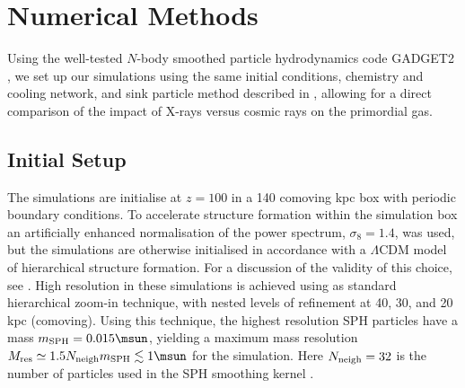 \section{Numerical Methods}
\label{methods}
Using the well-tested $N$-body smoothed particle hydrodynamics code GADGET2 \citep{Springel2005}, we set up our simulations using the same initial conditions, chemistry and cooling network, and sink particle method described in \citet{Hummeletal2014}, allowing for a direct comparison of the impact of X-rays versus cosmic rays on the primordial gas. 

\subsection{Initial Setup}
\label{setup}
The simulations are initialise at $z=100$ in a 140 comoving kpc box with periodic boundary conditions. To accelerate structure formation within the simulation box an artificially enhanced normalisation of the power spectrum, $\sigma_8 = 1.4$, was used, but the simulations are otherwise initialised in accordance with a $\Lambda$CDM model of hierarchical structure formation. For a discussion of the validity of this choice, see \citet{StacyGreifBromm2010}. High resolution in these simulations is achieved using as standard hierarchical zoom-in technique, with nested levels of refinement at 40, 30, and 20 kpc (comoving).  Using this technique, the highest resolution SPH particles have a mass $m_{\rm SPH} = 0.015\msun$, yielding a maximum mass resolution $M_{\rm res} \simeq 1.5 N_{\rm neigh} m_{\rm SPH} \lesssim 1\msun$ for the simulation.  Here $N_{\rm neigh} = 32$ is the number of particles used in the SPH smoothing kernel \citep{BateBurkert1997}.
